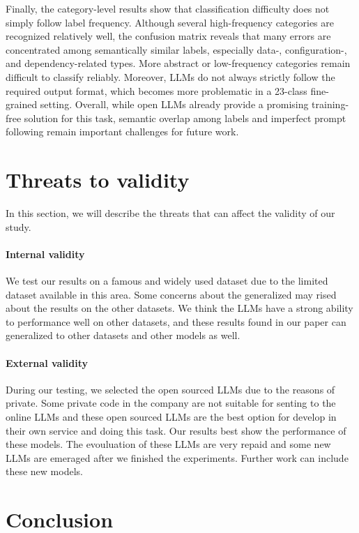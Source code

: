 \documentclass[acmsmall,screen,review,anonymous]{acmart}
\begin{document}
Finally, the category-level results show that classification difficulty does not simply follow label frequency. Although several high-frequency categories are recognized relatively well, the confusion matrix reveals that many errors are concentrated among semantically similar labels, especially data-, configuration-, and dependency-related types. More abstract or low-frequency categories remain difficult to classify reliably. Moreover, LLMs do not always strictly follow the required output format, which becomes more problematic in a 23-class fine-grained setting. Overall, while open LLMs already provide a promising training-free solution for this task, semantic overlap among labels and imperfect prompt following remain important challenges for future work.


\section{Threats to validity}\label{sec:threats}
In this section, we will describe the threats that can affect the validity of our study.

\paragraph{Internal validity}

We test our results on a famous and widely used dataset due to the limited dataset available in this area. Some concerns about the generalized may rised about the results on the other datasets. We think the LLMs have a strong ability to performance well on other datasets, and these results found in our paper can generalized to other datasets and other models as well.

\paragraph{External validity} 
During our testing, we selected the open sourced LLMs due to the reasons of private. Some private code in the company are not suitable for senting to the online LLMs and these open sourced LLMs are the best option for develop in their own service and doing this task. Our results best show the performance of these models. The evouluation of these LLMs are very repaid and some new LLMs are emeraged after we finished the experiments. Further work can include these new models.

\section{Conclusion}\label{sec:conclusion}
\end{document}
